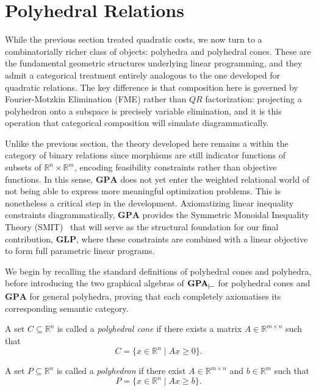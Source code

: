 \section{Polyhedral Relations}

While the previous section treated quadratic costs, we now
turn to a combinatorially richer class of objects: polyhedra and polyhedral
cones. These are the fundamental geometric structures underlying linear
programming, and they admit a categorical treatment entirely analogous to
the one developed for quadratic relations. The key difference is that
composition here is governed by Fourier-Motzkin Elimination (FME) rather
than $QR$ factorization: projecting a polyhedron onto a subspace is
precisely variable elimination, and it is this operation that categorical
composition will simulate diagrammatically.

Unlike the previous section, the theory developed here remains
a within  the category of binary relations since morphisms are still indicator functions
of subsets of $\mathbb{R}^n \times \mathbb{R}^m$, encoding feasibility
constraints rather than objective functions. In this sense, $\mathbf{GPA}$
does not yet enter the weighted relational world of not being able to express more meaningful
optimization problems. This is nonetheless a critical step in the development.
Axiomatizing linear inequality constraints diagrammatically,  $\mathbf{GPA}$ provides
the Symmetric Monoidal Inequality Theory (SMIT)~\cite{bonchi2021polyhedral}  that will
serve as the structural foundation for our final contribution,  $\mathbf{GLP}$,
where these constraints are combined with a linear objective to form full parametric linear programs.

We begin by recalling the standard definitions of polyhedral cones and
polyhedra, before introducing the two graphical algebras of
$\mathbf{GPA}_{\rtop}$ \cite{bonchi2021polyhedral} for polyhedral cones and $\mathbf{GPA}$ for
general polyhedra, proving that each completely axiomatises its
corresponding semantic category.

\begin{definition}\label{def:pcform}
A set $C \subseteq \mathbb{R}^n$ is called a \emph{polyhedral cone} if
there exists a matrix $A \in \mathbb{R}^{m \times n}$ such that
\[
C = \{x \in \mathbb{R}^n \mid Ax \ge 0\}.
\]
\end{definition}

\begin{definition}\label{polyform}
A set $P \subseteq \mathbb{R}^n$ is called a \emph{polyhedron} if there
exist $A \in \mathbb{R}^{m \times n}$ and $b \in \mathbb{R}^m$ such that
\[
P = \{x \in \mathbb{R}^n \mid Ax \ge b\}.
\]
\end{definition}

